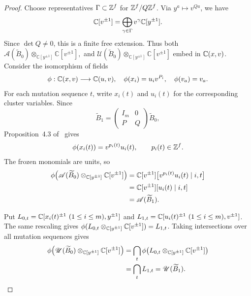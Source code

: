 \documentclass[12pt, letter]{amsart}
\theoremstyle{definition}
\begin{document}
\begin{proof}
Choose representatives $\Gamma\subset\mathbb{Z}^f$ for $\mathbb{Z}^f/Q\mathbb{Z}^f$.
Via $y^a\mapsto v^{Qa}$, we have
\begin{equation}
\label{eq:free_module}
 \mathbb{C}[v^{\pm1}]=\bigoplus_{\gamma\in\Gamma}v^\gamma\mathbb{C}[y^{\pm1}].
\end{equation}
Since $\det Q\ne0$, this is a finite free extension.
Thus both \(
\mathscr A(\widetilde B_0)
\otimes_{\mathbb C[y^{\pm1}]}\mathbb C[v^{\pm1}],
\) 
and 
\(
\mathscr U(\widetilde B_0)
\otimes_{\mathbb C[y^{\pm1}]}\mathbb C[v^{\pm1}]
\)
embed in $\mathbb{C}(x,v)$.
Consider the isomorphism of fields 
\[
\phi:\mathbb{C}(x,v)\longrightarrow\mathbb{C}(u,v), \quad \phi(x_i)=u_iv^{P_i}, \quad \phi(v_a)=v_a. 
\]
For each mutation sequence $t$, write $x_i(t)$ and $u_i(t)$ for the corresponding cluster variables.
Since
\[
 \widetilde B_1=\begin{pmatrix}I_m&0\\P&Q\end{pmatrix}\widetilde B_0,
\]
Proposition~4.3 of~\cite{Fra} gives
\[
 \phi(x_i(t))=v^{p_i(t)}u_i(t),\qquad p_i(t)\in\mathbb{Z}^f.
\]
The frozen monomials are units, so
\[
\begin{aligned}
 \phi\!\left(\mathscr{A}(\widetilde B_0)\otimes_{\mathbb{C}[y^{\pm1}]}\mathbb{C}[v^{\pm1}]\right)
 &=
\mathbb C[v^{\pm1}]
\bigl[v^{p_i(t)}u_i(t)\mid i,t\bigr]\\
&= \mathbb{C}[v^{\pm1}][u_i(t)\mid i,t]\\
 &=\mathscr{A}(\widetilde B_1).
\end{aligned}
\]

Put $L_{0,t}=\mathbb{C}[x_i(t)^{\pm1}\ (1\le i\le m),y^{\pm1}]$ and
$L_{1,t}=\mathbb{C}[u_i(t)^{\pm1}\ (1\le i\le m),v^{\pm1}]$.
The same rescaling gives
$\phi(L_{0,t}\otimes_{\mathbb{C}[y^{\pm1}]}\mathbb{C}[v^{\pm1}])=L_{1,t}$.
Taking intersections over all mutation sequences gives
\[
\begin{aligned}
 \phi\!\left(\mathscr{U}(\widetilde B_0)\otimes_{\mathbb{C}[y^{\pm1}]}\mathbb{C}[v^{\pm1}]\right)
 &=\bigcap_t\phi\!\left(L_{0,t}\otimes_{\mathbb{C}[y^{\pm1}]}\mathbb{C}[v^{\pm1}]\right)\\
 &=\bigcap_tL_{1,t}=\mathscr{U}(\widetilde B_1).
\end{aligned}
\]
\end{proof}
\end{document}
